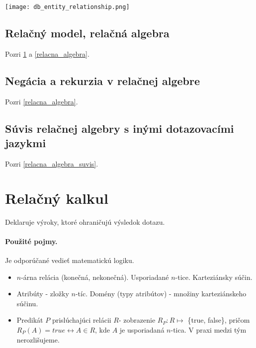 \documentclass[10pt,a4paper]{article}
\begin{document}
\begin{center}
\texttt{[image: db\_entity\_relationship.png]}
\end{center} 

\subsection{Relačný model, relačná algebra}
Pozri \ref{relacny_kalkul} a \ref{relacna_algebra}. 

\subsection{Negácia a rekurzia v relačnej algebre}
Pozri \ref{relacna_algebra}. 

\subsection{Súvis relačnej algebry s inými dotazovacími jazykmi}
Pozri \ref{relacna_algebra_suvis}.
    
\section{Relačný kalkul} 
\label{relacny_kalkul}

Deklaruje výroky, ktoré ohraničujú výsledok dotazu. 
\paragraph{Použité pojmy.}
Je odporúčané vedieť matematickú logiku. 

\begin{itemize}
\item $n$-árna relácia (konečná, nekonečná). Usporiadané $n$-tice. Karteziánsky súčin. 
\item Atribúty - zložky $n$-tíc. Domény (typy atribútov) - množiny karteziánskeho súčinu. 
\item Predikát $P$ prislúchajúci relácii $R$- zobrazenie $R_P : R \mapsto$ \{true, false\}, pričom $R_P(A) = true \leftrightarrow A \in R$, kde $A$ je usporiadaná $n$-tica. V praxi medzi tým nerozlišujeme. 
\end{itemize}
\end{document}
